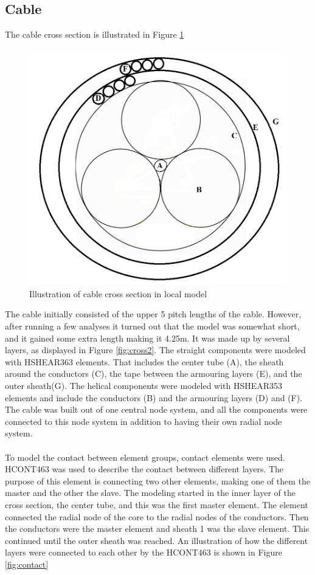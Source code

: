 \subsection{Cable}
The cable cross section is illustrated in Figure \ref{fig:crosspro}
\begin{figure}[H]
\centering
\includegraphics[scale=0.8]{figures/cross2}
\caption [$\; \:$ Cable cross section in local model]{Illustration of cable cross section in local model}
 \label{fig:crosspro}
\end{figure}
\noindent The cable initially consisted of the upper 5 pitch lengths of the cable. However, after running a few analyses it turned out that the model was somewhat short, and it gained some extra length making it 4.25m. It was made up by several layers, as displayed in Figure \ref{fig:cross2}.  The straight components were modeled with HSHEAR363 elements. That includes the center tube (A), the sheath around the conductors (C), the tape between the armouring layers (E), and the outer sheath(G). The helical components were modeled with HSHEAR353 elements and include the conductors (B) and the armouring layers (D) and (F). The cable was built out of one central node system, and all the components were connected to this node system in addition to having their own radial node system.\\\\ To model the contact between element groups, contact elements were used. HCONT463 was used to describe the contact between different layers. The purpose of this element is connecting two other elements, making one of them the master and the other the slave. The modeling started in the inner layer of the cross section, the center tube, and this was the first master element. The element connected the radial node of the core to the radial nodes of the conductors. Then the conductors were the master element and sheath 1 was the slave element. This continued until the outer sheath was reached. An illustration of how the different layers were connected to each other by the HCONT463 is shown in Figure \ref{fig:contact}

